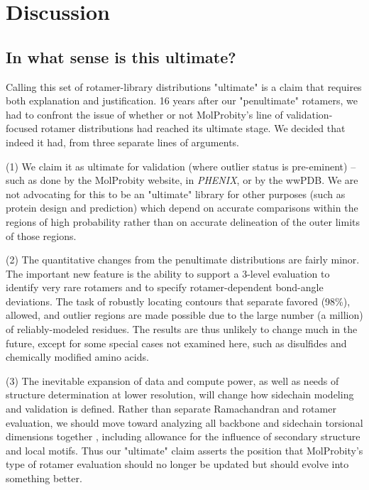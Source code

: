 \section{Discussion}

\subsection{In what sense is this ultimate?}
Calling this set of rotamer-library distributions "ultimate" is a claim that requires both explanation and justification. 16 years after our "penultimate" rotamers, we had to confront the issue of whether or not MolProbity's line of validation-focused rotamer distributions had reached its ultimate stage. We decided that indeed it had, from three separate lines of arguments.

(1) We claim it as ultimate for validation (where outlier status is pre-eminent)  -- such as done by the MolProbity website, in \textit{PHENIX}, or by the wwPDB. We are not advocating for this to be an "ultimate" library for other purposes (such as protein design and prediction) which depend on accurate comparisons within the regions of high probability rather than on accurate delineation of the outer limits of those regions.

(2) The quantitative changes from the penultimate distributions are fairly minor. The important new feature is the ability to support a 3-level evaluation to identify very rare rotamers and to specify rotamer-dependent bond-angle deviations. The task of robustly locating contours that separate favored (98\%), allowed, and outlier regions are made possible due to the large number (a million) of reliably-modeled residues. The results are thus unlikely to change much in the future, except for some special cases not examined here, such as disulfides and chemically modified amino acids.

(3) The inevitable expansion of data and compute power, as well as needs of structure determination at lower resolution, will change how sidechain modeling and validation is defined. Rather than separate Ramachandran and rotamer evaluation, we should move toward analyzing all backbone and sidechain torsional dimensions together \cite{JSR_theplot_2013}, including allowance for the influence of secondary structure and local motifs. Thus our "ultimate" claim asserts the position that MolProbity's type of rotamer evaluation should no longer be updated but should evolve into something better.

